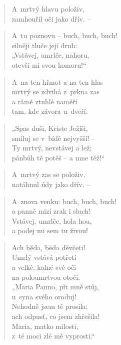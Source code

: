 \begin{verse}
A~mrtvý hlavu položiv, \\
zamhouřil oči jako dřív. --
\end{verse}

\begin{verse}
A~tu poznovu -- buch, buch, buch! \\
silněji tluče její druh: \\
„Vstávej, umrlče, nahoru, \\
otevři mi svou komoru!“
\end{verse}

\begin{verse}
A~na ten hřmot a na ten hlas \\
mrtvý se zdvihá z~prkna zas \\
a rámě ztuhlé naměří \\
tam, kde závora u~dveří.
\end{verse}

\begin{verse}
„Spas duši, Kriste Ježíši, \\
smiluj se v~bídě nejvyšší! -- \\
Ty mrtvý, nevstávej a lež; \\
pánbůh tě potěš -- a mne též!“
\end{verse}

\begin{verse}
A~mrtvý zas se položiv, \\
natáhnul údy jako dřív. --
\end{verse}

\begin{verse}
A~znova venku: buch, buch, buch! \\
a panně mizí zrak i sluch! \\
Vstávej, umrlče, hola hou, \\
a podej mi sem tu živou!
\end{verse}

\begin{verse}
Ach běda, běda děvčeti! \\
Umrlý vstává potřetí \\
a velké, kalné své oči \\
na poloumrtvou otočí. \\
„Maria Panno, při mně stůj, \\
u~syna svého oroduj! \\
Nehodně jsem tě prosila: \\
ach odpusť, co jsem zhřešila! \\
Maria, matko milosti, \\
z~té moci zlé mě vyprosti.“
\end{verse}

